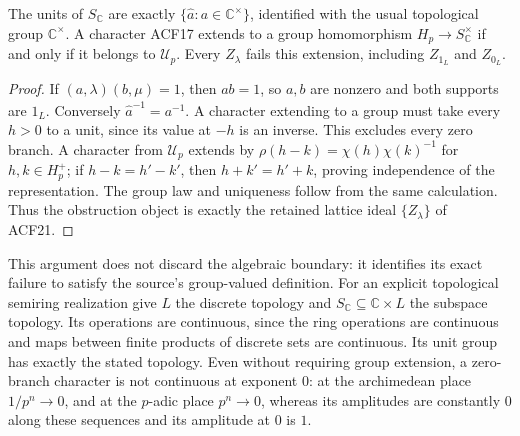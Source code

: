 \begin{proposition}
The units of $S_{\mathbb C}$ are exactly
$\{\widehat a:a\in\mathbb C^\times\}$, identified with the usual
topological group $\mathbb C^\times$. A character ACF17 extends to a
group homomorphism $H_p\to S_{\mathbb C}^{\times}$ if and only if it
belongs to $\mathcal U_p$. Every $Z_\lambda$ fails this extension,
including $Z_{1_L}$ and $Z_{0_L}$.
\end{proposition}
\begin{proof}
If $(a,\lambda)(b,\mu)=1$, then $ab=1$, so $a,b$ are nonzero and both
supports are $1_L$. Conversely $\widehat a^{-1}=\widehat{a^{-1}}$.
A character extending to a group must take every $h>0$ to a unit,
since its value at $-h$ is an inverse. This excludes every zero branch.
A character from $\mathcal U_p$ extends by
$\rho(h-k)=\chi(h)\chi(k)^{-1}$ for $h,k\in H_p^+$;
if $h-k=h'-k'$, then $h+k'=h'+k$, proving independence of the
representation. The group law and uniqueness follow from the same
calculation. Thus the obstruction object is exactly the retained
lattice ideal $\{Z_\lambda\}$ of ACF21.
\end{proof}
This argument does not discard the algebraic boundary: it identifies
its exact failure to satisfy the source's group-valued definition.
For an explicit topological semiring realization give $L$ the
discrete topology and $S_{\mathbb C}\subseteq\mathbb C\times L$ the
subspace topology. Its operations are continuous, since the ring
operations are continuous and maps between finite products of
discrete sets are continuous. Its unit group has exactly the stated
topology. Even without requiring group extension, a zero-branch
character is not continuous at exponent $0$: at the archimedean place
$1/p^n\to0$, and at the $p$-adic place $p^n\to0$, whereas its amplitudes
are constantly $0$ along these sequences and its amplitude at $0$ is
$1$.

